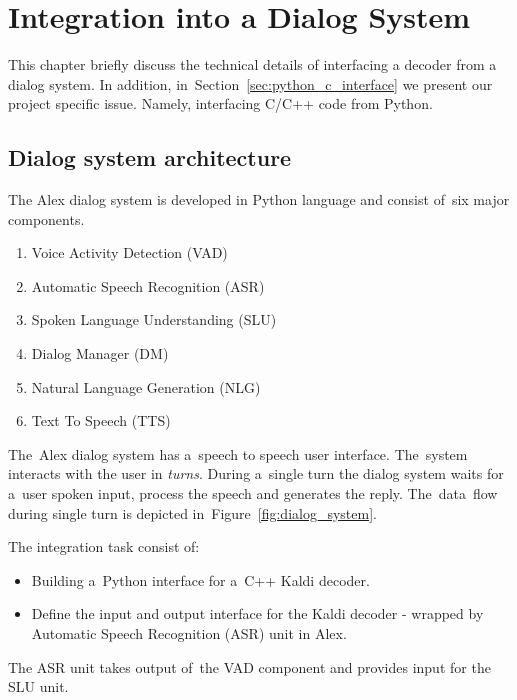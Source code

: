 \chapter{Integration into a Dialog System}
\label{cha:integration}
This chapter briefly discuss the technical details of interfacing
a decoder from a dialog system.
In addition, in~Section~\ref{sec:python_c_interface} we present our project specific issue.
Namely, interfacing C/C++ code from Python.





\section{Dialog system architecture} 
\label{sec:dialog_system_architecture}
The Alex dialog system is developed in Python language and consist of~six major components. 
\begin{enumerate}
    \item Voice Activity Detection (VAD)
    \item Automatic Speech Recognition (ASR) 
    \item Spoken Language Understanding (SLU)
    \item Dialog Manager (DM)
    \item Natural Language Generation (NLG)
    \item Text To Speech (TTS)
\end{enumerate}
The~Alex dialog system has a~speech to speech user interface. The~system interacts with the user in {\it turns}. During a~single turn the dialog system waits for a~user spoken input, process the speech and generates the reply.
The~data~flow during single turn is depicted in~Figure~\ref{fig:dialog_system}.

The integration task consist of:
\begin{itemize}
    \item Building a~Python interface for a~C++ Kaldi decoder.
    \item Define the input and output interface for the Kaldi decoder - wrapped by Automatic Speech Recognition (ASR) unit in Alex.
\end{itemize}
 The ASR unit takes output of~the VAD component and provides input for the SLU unit. 

